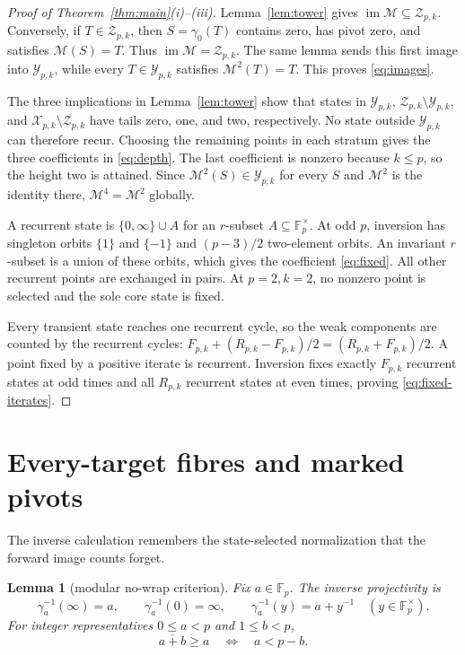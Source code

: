 \documentclass[a4paper,10pt]{amsart}
\newtheorem{lemma}[theorem]{Lemma}
\theoremstyle{remark}
\newcommand{\F}{\mathbb F}
\newcommand{\X}{\mathcal X}
\newcommand{\Y}{\mathcal Y}
\newcommand{\Z}{\mathcal Z}
\newcommand{\M}{\mathcal M}
\newcommand{\im}{\operatorname{im}}
\begin{document}
\begin{proof}[Proof of Theorem~\ref{thm:main}(i)--(iii)]
Lemma~\ref{lem:tower} gives $\im\M\subseteq\Z_{p,k}$.  Conversely, if
$T\in\Z_{p,k}$, then $S=\gamma_0(T)$ contains zero, has pivot zero, and
satisfies $\M(S)=T$.  Thus $\im\M=\Z_{p,k}$.  The same lemma sends this
first image into $\Y_{p,k}$, while every $T\in\Y_{p,k}$ satisfies
$\M^2(T)=T$.  This proves \eqref{eq:images}.

The three implications in Lemma~\ref{lem:tower} show that states in
$\Y_{p,k}$, $\Z_{p,k}\setminus\Y_{p,k}$, and
$\X_{p,k}\setminus\Z_{p,k}$ have tails zero, one, and two, respectively.
No state outside $\Y_{p,k}$ can therefore recur.  Choosing the remaining
points in each stratum gives the three coefficients in \eqref{eq:depth}.
The last coefficient is nonzero because $k\leq p$, so the height two is
attained.  Since $\M^2(S)\in\Y_{p,k}$ for every $S$ and $\M^2$ is the
identity there, $\M^4=\M^2$ globally.

A recurrent state is $\{0,\infty\}\cup A$ for an $r$-subset
$A\subseteq\F_p^\times$.  At odd $p$, inversion has singleton orbits
$\{1\}$ and $\{-1\}$ and $(p-3)/2$ two-element orbits.  An invariant
$r$-subset is a union of these orbits, which gives the coefficient
\eqref{eq:fixed}.  All other recurrent points are exchanged in pairs.  At
$p=2,k=2$, no nonzero point is selected and the sole core state is fixed.

Every transient state reaches one recurrent cycle, so the weak components
are counted by the recurrent cycles:
$F_{p,k}+(R_{p,k}-F_{p,k})/2=(R_{p,k}+F_{p,k})/2$.  A point fixed by a
positive iterate is recurrent.  Inversion fixes exactly $F_{p,k}$ recurrent
states at odd times and all $R_{p,k}$ recurrent states at even times, proving
\eqref{eq:fixed-iterates}.
\end{proof}

\section{Every-target fibres and marked pivots}

The inverse calculation remembers the state-selected normalization that the
forward image counts forget.

\begin{lemma}[modular no-wrap criterion]\label{lem:nowrap}
Fix $a\in\F_p$.  The inverse projectivity is
\begin{equation}\label{eq:inverse-projectivity}
 \gamma_a^{-1}(\infty)=a,\qquad
 \gamma_a^{-1}(0)=\infty,\qquad
 \gamma_a^{-1}(y)=a+y^{-1}\quad(y\in\F_p^\times).
\end{equation}
For integer representatives $0\leq a<p$ and $1\leq b<p$,
\begin{equation}\label{eq:nowrap}
 \overline{a+b}\geq a\quad\Longleftrightarrow\quad a<p-b.
\end{equation}
\end{lemma}
\end{document}
